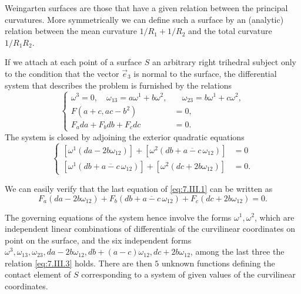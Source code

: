 \documentclass[leqno,11pt]{book}
\numberwithin{equation}{chapter}
\theoremstyle{shape1}
\theoremstyle{shape0}
\theoremstyle{shape2}
\theoremstyle{definition}
\begin{document}
\fsec Weingarten surfaces are those that have a given relation between the principal curvatures. More symmetrically we can define such a surface by an (analytic) relation between the mean curvature $1/R_{1}+1/R_{2}$ and the total curvature $1/R_{1}R_{2}$.

If we attach at each point of a surface $S$ an arbitrary right trihedral subject only to the condition that the vector $\vec e_{3}$ is normal to the surface, the differential system that describes the problem is furnished by the relations
\begin{equation}
  \label{eq:7.III.1}
  \tag{III, 1}
  \left\{
    \begin{aligned}
      \omega^{3}=0,\quad\omega_{13}=a\omega^{1}+b\omega^{2},&\quad\omega_{23}=b\omega^{1}+c\omega^{2},\\
      F(a+c,ac-b^{2})&=0,\\
      F_{a}da+F_{b}db+F_{c}dc&=0.
    \end{aligned}
  \right.
\end{equation}
The system is closed by adjoining the exterior quadratic equations
\begin{equation}
  \label{eq:7.III.2}
  \tag{III, 2}
  \left\{
    \begin{aligned}{}
      [\omega^{1}(da-2b\omega_{12})]+[\omega^{2}(db+\overline{a-c}\,\omega_{12})]&=0\\
      [\omega^{1}(db+\overline{a-c}\,\omega_{12})]+[\omega^{2}(dc+2b\omega_{12})]&=0.
    \end{aligned}
  \right.
\end{equation}

We can easily verify that the last equation of \eqref{eq:7.III.1} can be written as
\begin{equation}
  \label{eq:7.III.3}
  \tag{III, 3}
  F_{a}(da-2b\omega_{12})+F_{b}(db+\overline{a-c}\,\omega_{12})+F_{c}(dc+2b\omega_{12})=0.
\end{equation}

The governing equations of the system hence involve the forms $\omega^{1},\omega^{2}$, which are independent linear combinations of  differentials of the curvilinear coordinates on point on the surface, and the six independent forms $\omega^{3},\omega_{13},\omega_{23},da-2b\omega_{12},db+(a-c)\omega_{12},dc+2b\omega_{12}$, among the last three the relation \eqref{eq:7.III.3} holds. There are then $5$ unknown functions defining the contact element of $S$ corresponding to a system of given values of the curvilinear coordinates.
\end{document}
